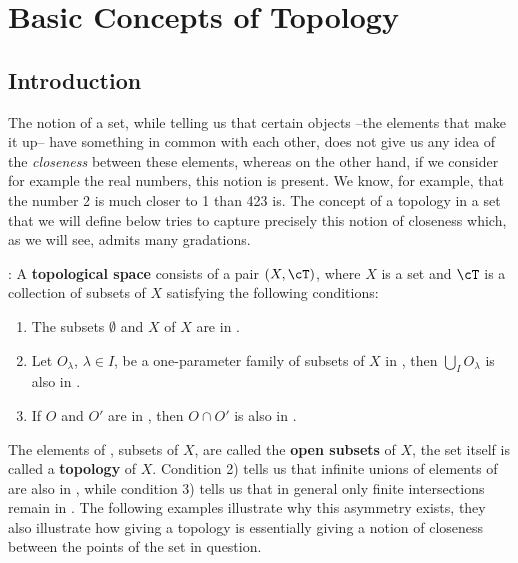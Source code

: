 
%

\chapter{Basic Concepts of Topology}


\section{Introduction}

The notion of a set, while telling us that certain objects --the elements that make it up-- have something in common with each other, does not give us any idea of the {\it closeness} between these elements, whereas on the other hand, if we consider for example the real numbers, this notion is present. We know, for example, that the number 2 is much closer to 1 than 423 is. The concept of a topology in a set that we will define below tries to capture precisely this notion of closeness which, as we will see, admits many gradations.

: A {\bf topological space} consists of a pair $(X, \cT)$, where $X$ is a set and $\cT$ is a collection of subsets of $X$ satisfying the following conditions:

\begin{enumerate} \item The subsets $\emptyset$ and $X$ of $X$ are in \cT. \item Let $O_{\lambda}$, $\lambda \in I$, be a one-parameter family of subsets of $X$ in \cT, then $\bigcup_I O_{\lambda}$ is also in \cT. \item If $O$ and $O'$ are in \cT, then $O \cap O'$ is also in \cT.

\end{enumerate}

The elements of \cT, subsets of $X$, are called the {\bf open subsets} of $X$, the set \cT itself is called a {\bf topology} of $X$. Condition 2) tells us that infinite unions of elements of \cT are also in \cT, while condition 3) tells us that in general only finite intersections remain in \cT. The following examples illustrate why this asymmetry exists, they also illustrate how giving a topology is essentially giving a notion of closeness between the points of the set in question.

